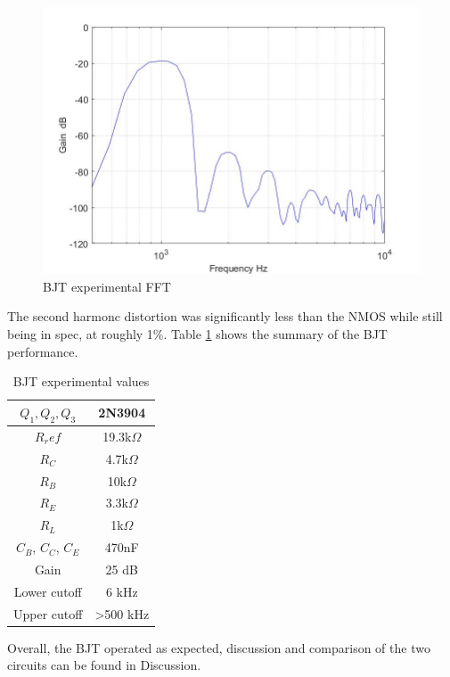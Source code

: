 \begin{figure}[H]
	\centering
	\includegraphics[width=0.7\linewidth]{ExperimentalImplementation/bjt_fft.jpg}
	\caption{BJT experimental FFT}
	\label{fig:bjtexpfft}
\end{figure}

The second harmonc distortion was significantly less than the NMOS while still being in spec, at roughly 1\%. Table \ref{tab:bjtexp} shows the summary of the BJT performance.




\begin{table}[H]
	\centering
	\caption{BJT experimental values}
	\label{tab:bjtexp}
	\begin{tabular}{cc}
		$Q_1, Q_2, Q_3$ & 2N3904        \\ \hline
		$R_ref$         & 19.3k$\Omega$ \\ \hline
		$R_C$           & 4.7k$\Omega$  \\ \hline
		$R_B$           & 10k$\Omega$   \\ \hline 
		$R_E$           & 3.3k$\Omega$  \\ \hline 
		$R_L$           & 1k$\Omega$    \\ \hline
		$C_B$, $C_C$, $C_E$ & 470nF     \\ \hline
		Gain           & 25 dB          \\ \hline
		Lower cutoff   & 6 kHz          \\ \hline
		Upper cutoff   &  >500 kHz      \\ \hline
	\end{tabular}
\end{table}

Overall, the BJT operated as expected, discussion and comparison of the two circuits can be found in Discussion.


%



